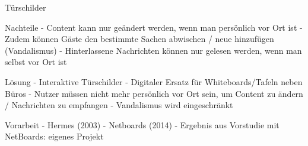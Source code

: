 \documentclass[11pt]{beamer}
\begin{document}
\begin{frame}{Türschilder}
\begin{itemize}
  \end{itemize}
\end{frame}
\begin{frame}{Nachteile}
    - Content kann nur geändert werden, wenn man persönlich vor Ort ist
    - Zudem können Gäste den bestimmte Sachen abwischen / neue hinzufügen (Vandalismus)
    - Hinterlassene Nachrichten können nur gelesen werden, wenn man selbst vor Ort ist
\end{frame}
\begin{frame}{Lösung}
    - Interaktive Türschilder
    - Digitaler Ersatz für Whiteboards/Tafeln neben Büros
    - Nutzer müssen nicht mehr persönlich vor Ort sein, um Content zu ändern / Nachrichten zu empfangen
    - Vandalismus wird eingeschränkt
\end{frame}
\begin{frame}{Vorarbeit}
    - Hermes (2003)
    - Netboards (2014)
  - Ergebnis aus Vorstudie mit NetBoards: eigenes Projekt
\end{frame}

\end{document}
